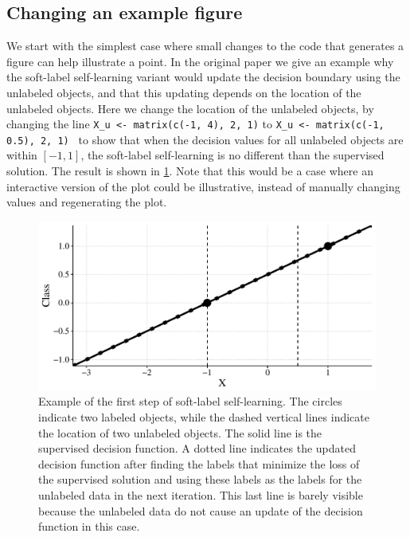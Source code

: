 \documentclass[runningheads,a4paper]{llncs}\usepackage[]{graphicx}\usepackage[]{color}
\newenvironment{knitrout}{}{} %
\newcommand{\inlinecode}{\texttt}
\begin{document}
\subsection{Changing an example figure}
We start with the simplest case where small changes to the code that generates a figure can help illustrate a point. In the original paper we give an example why the soft-label self-learning variant would update the decision boundary using the unlabeled objects, and that this updating depends on the location of the unlabeled objects. Here we change the location of the unlabeled objects, by changing the line \inlinecode{X\_u <-  matrix(c(-1, 4), 2, 1)} to \inlinecode{X\_u <-  matrix(c(-1, 0.5), 2, 1) } to show that when the decision values for all unlabeled objects are within $[-1,1]$, the soft-label self-learning is no different than the supervised solution. The result is shown in \cref{fig:additional-simple-example}. Note that this would be a case where an interactive version of the plot could be illustrative, instead of manually changing values and regenerating the plot.

\begin{knitrout}
\color{fgcolor}\begin{figure}

{\centering \includegraphics[width=0.8\linewidth]{figure/additional-simple-example-1} 

}

\caption[Example of the first step of soft-label self-learning]{Example of the first step of soft-label self-learning. The circles indicate two labeled objects, while the dashed vertical lines indicate the location of two unlabeled objects. The solid line is the supervised decision function. A dotted line indicates the updated decision function after finding the labels that minimize the loss of the supervised solution and using these labels as the labels for the unlabeled data in the next iteration. This last line is barely visible because the unlabeled data do not cause an update of the decision function in this case.}\label{fig:additional-simple-example}
\end{figure}


\end{knitrout}
\end{document}
